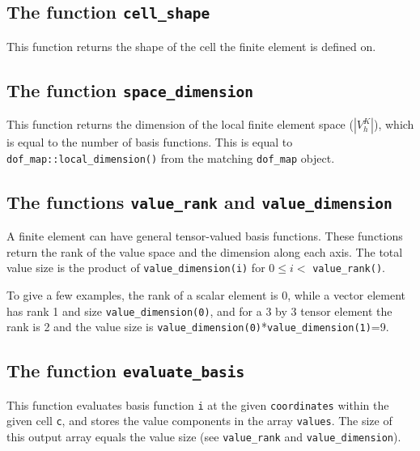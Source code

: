 
\subsection{The function \texttt{cell\_shape}}
This function returns the shape of the cell the finite element is defined on.


\subsection{The function \texttt{space\_dimension}}
This function returns the dimension of the local finite element space ($| V_h^K |$),
which is equal to the number of basis functions. This is equal to \texttt{dof\_map::local\_dimension()}
from the matching \texttt{dof\_map} object.



\subsection{The functions \texttt{value\_rank} and \texttt{value\_dimension}}
A finite element can have general tensor-valued basis functions.
These functions return the rank of the value space and the dimension along each axis.
The total value size is the product of \texttt{value\_dimension(i)} for $0 \le i <$ \texttt{value\_rank()}.

To give a few examples, the rank of a scalar element is 0, while a vector element has rank 1 and size \texttt{value\_dimension(0)}, 
and for a 3 by 3 tensor element the rank is 2 and the value size is \texttt{value\_dimension(0)}*\texttt{value\_dimension(1)}=9.


\subsection{The function \texttt{evaluate\_basis}}
This function evaluates basis function \texttt{i} at the given \texttt{coordinates}
within the given cell \texttt{c}, and stores the value components in the array \texttt{values}.
The size of this output array equals the value size (see \texttt{value\_rank} and \texttt{value\_dimension}).

